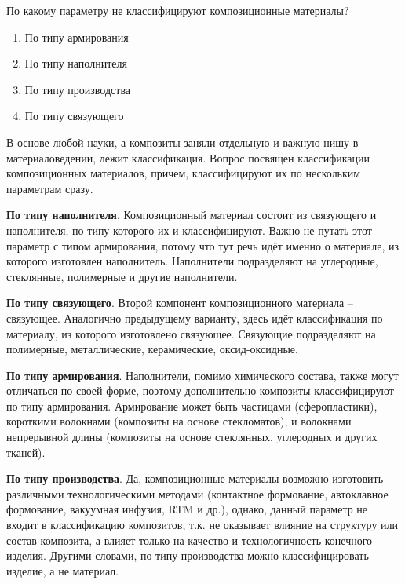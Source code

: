 
По какому параметру не классифицируют композиционные материалы? 

\begin{enumerate}
    \item По типу армирования
    \item По типу наполнителя
    \item По типу производства
    \item По типу связующего
\end{enumerate}

\explanationSection

В основе любой науки, а композиты заняли отдельную и важную нишу в материаловедении, лежит классификация. Вопрос посвящен классификации композиционных материалов, причем, классифицируют их по нескольким параметрам сразу.

\textbf{По типу наполнителя}. Композиционный материал состоит из связующего и наполнителя, по типу которого их и классифицируют. Важно не путать этот параметр с типом армирования, потому что тут речь идёт именно о материале, из которого изготовлен наполнитель. Наполнители подразделяют на углеродные, стеклянные, полимерные и другие наполнители.

\textbf{По типу связующего}. Второй компонент композиционного материала – связующее. Аналогично предыдущему варианту, здесь идёт классификация по материалу, из которого изготовлено связующее. Связующие подразделяют на полимерные, металлические, керамические, оксид-оксидные.

\textbf{По типу армирования}. Наполнители, помимо химического состава, также могут отличаться по своей форме, поэтому дополнительно композиты классифицируют по типу армирования. Армирование может быть частицами (сферопластики), короткими волокнами (композиты на основе стекломатов), и волокнами непрерывной длины (композиты на основе стеклянных, углеродных и других тканей).

\textbf{По типу производства}. Да, композиционные материалы возможно изготовить различными технологическими методами (контактное формование, автоклавное формование, вакуумная инфузия, RTM и др.), однако, данный параметр не входит в классификацию композитов, т.к. не оказывает влияние на структуру или состав композита, а влияет только на качество и технологичность конечного изделия. Другими словами, по типу производства можно классифицировать изделие, а не материал.

